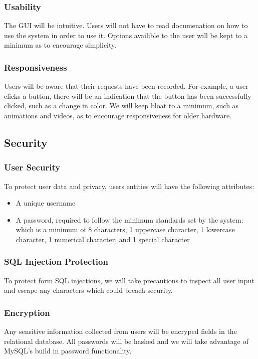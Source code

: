 \documentclass[letter, 12pt, titlepage]{article}
\begin{document}
			\subsubsection{Usability}
				The GUI will be intuitive. Users will not have to read documenation on how to use the system in order to use it. Options availible to the user will be kept to a minimum as to encourage simplicity.
			\subsubsection{Responsiveness}
				Users will be aware that their requests have been recorded. For example, a user clicks a button, there will be an indication that the button has been successfully clicked, such as a change in color. We will keep bloat to a minimum, such as animations and videos, as to encourage responsiveness for older hardware.

		\subsection{Security}
			\subsubsection{User Security}
				To protect user data and privacy, users entities will have the following attributes:
				\begin{itemize}
						\item A unique username
						\item A password, required to follow the minimum standards set by the system: which is a minimum of 8 characters, 1 uppercase character, 1 lowercase character, 1 numerical character, and 1 special character
				\end{itemize}

			\subsubsection{SQL Injection Protection}
				To protect form SQL injections, we will take precautions to inspect all user input and escape any characters which could breach security.

			\subsubsection{Encryption}
				Any sensitive information collected from users will be encryped fields in the relational database. All passwords will be hashed and we will take advantage of MySQL's build in password functionality.
\end{document}
